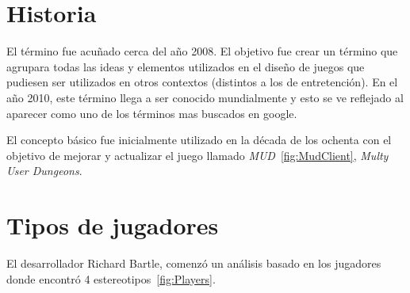 \section{Historia}

El término {\GAM} fue acuñado cerca del año 2008\cite{DefineGamefication}.
El objetivo fue crear un término que agrupara todas las ideas y elementos
utilizados en el diseño de juegos que pudiesen ser utilizados en otros contextos
(distintos a los de entretención).
En el año 2010, este término llega a ser conocido mundialmente  y esto se ve reflejado
 al aparecer como uno de los términos mas buscados en google\cite{GamWorks}.


El concepto básico fue inicialmente utilizado en la década de los ochenta con el
objetivo de mejorar y actualizar el juego llamado \emph{MUD}~\ref{fig:MudClient},
\emph{Multy User Dungeons}.

\section{Tipos de jugadores}

El desarrollador Richard Bartle, comenzó un análisis basado en los jugadores
donde encontró 4 estereotipos~\ref{fig:Players}.

